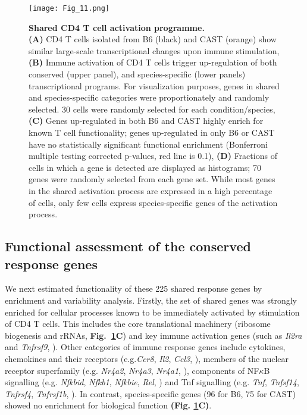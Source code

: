 \begin{figure}[!ht]
\centering
\texttt{[image: Fig\_11.png]}
\caption[Shared CD4\plus{} T cell activation programme]{\textbf{Shared CD4\plus{} T cell activation programme.}\\
\textbf{(A)} CD4\plus{} T cells isolated from B6 (black) and CAST (orange) show similar large-scale transcriptional changes upon immune stimulation, \textbf{(B)} Immune activation of CD4\plus{} T cells trigger up-regulation of both conserved (upper panel), and species-specific (lower panels) transcriptional programs. For visualization purposes, genes in shared and species-specific categories were proportionately and randomly selected. 30 cells were randomly selected for each condition/species, \textbf{(C)} Genes up-regulated in both B6 and CAST highly enrich for known T cell functionality; genes up-regulated in only B6 or CAST have no statistically significant functional enrichment (Bonferroni multiple testing corrected p-values, red line is 0.1), \textbf{(D)} Fractions of cells in which a gene is detected are displayed as histograms; 70 genes were randomly selected from each gene set. While most genes in the shared activation process are expressed in a high percentage of cells, only few cells express species-specific genes of the activation process.}
\label{fig1:shared_activation}
\end{figure}

\newpage

\subsection{Functional assessment of the conserved response genes}

We next estimated functionality of these 225 shared response genes by enrichment and variability analysis. Firstly, the set of shared genes was strongly enriched for cellular processes known to be immediately activated by stimulation of CD4\plus{} T cells. This includes the core translational machinery (ribosome biogenesis and rRNAs, \textbf{Fig.~\ref{fig1:shared_activation}C}) and key immune activation genes (such as \textit{Il2ra} and \textit{Tnfrsf9}, \citep{Asmal2003}). Other categories of immune response genes include cytokines, chemokines and their receptors (e.g.\textit{Ccr8}, \textit{Il2}, \textit{Ccl3}, \citep{Turner2014}), members of the nuclear receptor superfamily (e.g. \textit{Nr4a2}, \textit{Nr4a3}, \textit{Nr4a1}, \citep{Glass2010}), components of NF$\kappa$B signalling (e.g. \textit{Nfkbid}, \textit{Nfkb1}, \textit{Nfkbie}, \textit{Rel}, \citep{Gerondakis2010}) and Tnf signalling (e.g. \textit{Tnf}, \textit{Tnfsf14}, \textit{Tnfrsf4}, \textit{Tnfrsf1b}, \citep{Croft2009}). In contrast, species-specific genes (96 for B6, 75 for CAST) showed no enrichment for biological function \textbf{(Fig. \ref{fig1:shared_activation}C)}. \\

